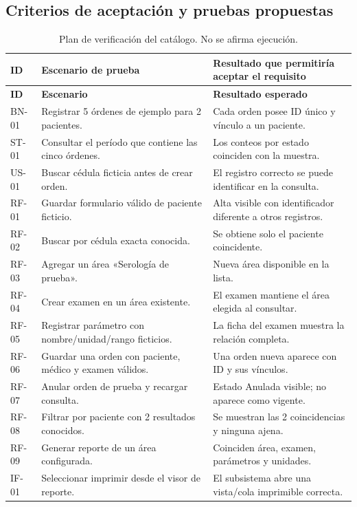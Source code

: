 \subsection{Criterios de aceptación y pruebas propuestas}
\begingroup\footnotesize
\begin{longtable}{|p{1.4cm}|p{5.4cm}|p{7.0cm}|}
\caption{Plan de verificación del catálogo. No se afirma ejecución.}\label{tab:pruebas}\\\hline
\textbf{ID} & \textbf{Escenario de prueba} & \textbf{Resultado que permitiría aceptar el requisito}\\\hline\endfirsthead\hline\textbf{ID} & \textbf{Escenario} & \textbf{Resultado esperado}\\\hline\endhead
BN-01 & Registrar 5 órdenes de ejemplo para 2 pacientes. & Cada orden posee ID único y vínculo a un paciente.\\\hline
ST-01 & Consultar el período que contiene las cinco órdenes. & Los conteos por estado coinciden con la muestra.\\\hline
US-01 & Buscar cédula ficticia antes de crear orden. & El registro correcto se puede identificar en la consulta.\\\hline
RF-01 & Guardar formulario válido de paciente ficticio. & Alta visible con identificador diferente a otros registros.\\\hline
RF-02 & Buscar por cédula exacta conocida. & Se obtiene solo el paciente coincidente.\\\hline
RF-03 & Agregar un área «Serología de prueba». & Nueva área disponible en la lista.\\\hline
RF-04 & Crear examen en un área existente. & El examen mantiene el área elegida al consultar.\\\hline
RF-05 & Registrar parámetro con nombre/unidad/rango ficticios. & La ficha del examen muestra la relación completa.\\\hline
RF-06 & Guardar una orden con paciente, médico y examen válidos. & Una orden nueva aparece con ID y sus vínculos.\\\hline
RF-07 & Anular orden de prueba y recargar consulta. & Estado Anulada visible; no aparece como vigente.\\\hline
RF-08 & Filtrar por paciente con 2 resultados conocidos. & Se muestran las 2 coincidencias y ninguna ajena.\\\hline
RF-09 & Generar reporte de un área configurada. & Coinciden área, examen, parámetros y unidades.\\\hline
IF-01 & Seleccionar imprimir desde el visor de reporte. & El subsistema abre una vista/cola imprimible correcta.\\\hline

\end{longtable}
